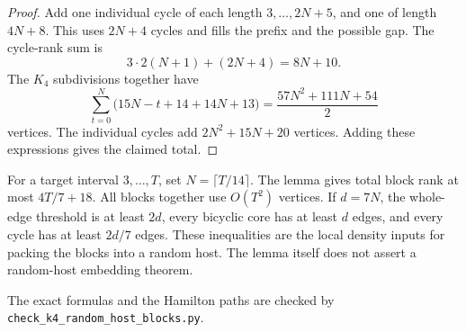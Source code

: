 \begin{proof}
Add one individual cycle of each length $3,\ldots,2N+5$, and one of length $4N+8$.
This uses $2N+4$ cycles and fills the prefix and the possible gap.
The cycle-rank sum is
\[
 3\cdot2(N+1)+(2N+4)=8N+10.
\]
The $K_4$ subdivisions together have
\[
 \sum_{t=0}^{N}\bigl(15N-t+14+14N+13\bigr)
 =\frac{57N^2+111N+54}{2}
\]
vertices.
The individual cycles add $2N^2+15N+20$ vertices.
Adding these expressions gives the claimed total.
\end{proof}

For a target interval $3,\ldots,T$, set $N=\lceil T/14\rceil$.
The lemma gives total block rank at most $4T/7+18$.
All blocks together use $O(T^2)$ vertices.
If $d=7N$, the whole-edge threshold is at least $2d$, every bicyclic core has at least $d$ edges,
and every cycle has at least $2d/7$ edges.
These inequalities are the local density inputs for packing the blocks into a random host.
The lemma itself does not assert a random-host embedding theorem.

The exact formulas and the Hamilton paths are checked by
\nolinkurl{check_k4_random_host_blocks.py}.
